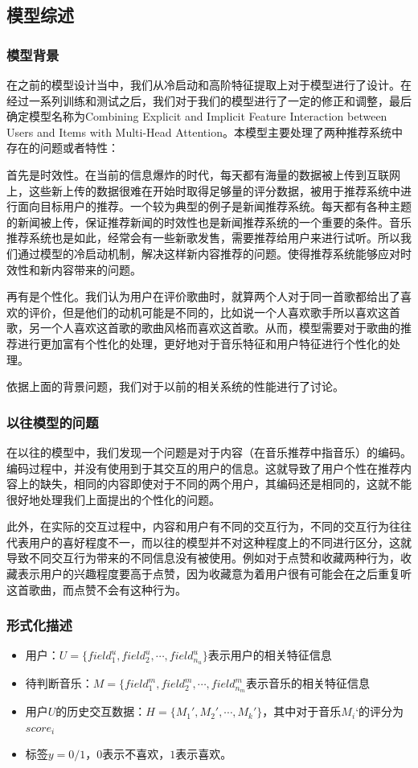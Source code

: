 \subsection{模型综述}
\subsubsection{模型背景}
在之前的模型设计当中，我们从冷启动和高阶特征提取上对于模型进行了设计。在经过一系列训练和测试之后，我们对于我们的模型进行了一定的修正和调整，最后确定模型名称为Combining Explicit and Implicit Feature Interaction between Users and Items with Multi-Head Attention。本模型主要处理了两种推荐系统中存在的问题或者特性：

首先是时效性。在当前的信息爆炸的时代，每天都有海量的数据被上传到互联网上，这些新上传的数据很难在开始时取得足够量的评分数据，被用于推荐系统中进行面向目标用户的推荐。一个较为典型的例子是新闻推荐系统。每天都有各种主题的新闻被上传，保证推荐新闻的时效性也是新闻推荐系统的一个重要的条件。音乐推荐系统也是如此，经常会有一些新歌发售，需要推荐给用户来进行试听。所以我们通过模型的冷启动机制，解决这样新内容推荐的问题。使得推荐系统能够应对时效性和新内容带来的问题。

再有是个性化。我们认为用户在评价歌曲时，就算两个人对于同一首歌都给出了喜欢的评价，但是他们的动机可能是不同的，比如说一个人喜欢歌手所以喜欢这首歌，另一个人喜欢这首歌的歌曲风格而喜欢这首歌。从而，模型需要对于歌曲的推荐进行更加富有个性化的处理，更好地对于音乐特征和用户特征进行个性化的处理。

依据上面的背景问题，我们对于以前的相关系统的性能进行了讨论。

\subsubsection{以往模型的问题}
在以往的模型中，我们发现一个问题是对于内容（在音乐推荐中指音乐）的编码。编码过程中，并没有使用到于其交互的用户的信息。这就导致了用户个性在推荐内容上的缺失，相同的内容即使对于不同的两个用户，其编码还是相同的，这就不能很好地处理我们上面提出的个性化的问题。

此外，在实际的交互过程中，内容和用户有不同的交互行为，不同的交互行为往往代表用户的喜好程度不一，而以往的模型并不对这种程度上的不同进行区分，这就导致不同交互行为带来的不同信息没有被使用。例如对于点赞和收藏两种行为，收藏表示用户的兴趣程度要高于点赞，因为收藏意为着用户很有可能会在之后重复听这首歌曲，而点赞不会有这种行为。

\subsubsection{形式化描述}
\begin{itemize}
    \item 用户：$U=\{field_{1}^{u}, field_{2}^{u}, \cdots, field_{n_u}^{u}\}$表示用户的相关特征信息
    \item 待判断音乐：$M=\{field_{1}^{m}, field_{2}^{m}, \cdots, field_{n_m}^{m}$表示音乐的相关特征信息
    \item 用户$U$的历史交互数据：$H=\{M_1', M_2',\cdots, M_k'\}$，其中对于音乐$M_i‘$的评分为$score_i$
    \item 标签$y=0/1$，$0$表示不喜欢，$1$表示喜欢。
\end{itemize}

